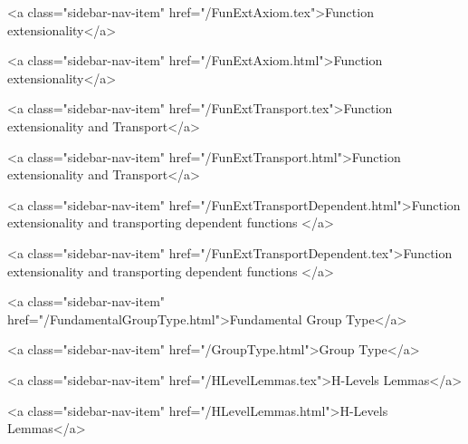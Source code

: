       
    
      
        
          <a class="sidebar-nav-item" href="/FunExtAxiom.tex">Function extensionality</a>
        
      
    
      
        
          <a class="sidebar-nav-item" href="/FunExtAxiom.html">Function extensionality</a>
        
      
    
      
        
          <a class="sidebar-nav-item" href="/FunExtTransport.tex">Function extensionality and Transport</a>
        
      
    
      
        
          <a class="sidebar-nav-item" href="/FunExtTransport.html">Function extensionality and Transport</a>
        
      
    
      
        
          <a class="sidebar-nav-item" href="/FunExtTransportDependent.html">Function extensionality and transporting dependent functions </a>
        
      
    
      
        
          <a class="sidebar-nav-item" href="/FunExtTransportDependent.tex">Function extensionality and transporting dependent functions </a>
        
      
    
      
        
          <a class="sidebar-nav-item" href="/FundamentalGroupType.html">Fundamental Group Type</a>
        
      
    
      
        
          <a class="sidebar-nav-item" href="/GroupType.html">Group Type</a>
        
      
    
      
        
          <a class="sidebar-nav-item" href="/HLevelLemmas.tex">H-Levels Lemmas</a>
        
      
    
      
        
          <a class="sidebar-nav-item" href="/HLevelLemmas.html">H-Levels Lemmas</a>
        
      
    
